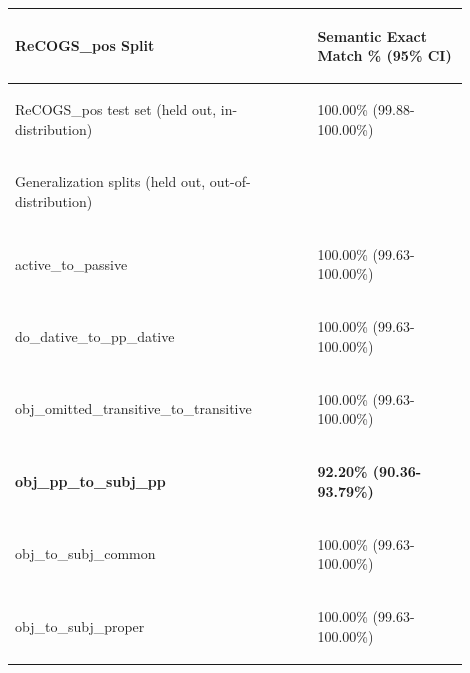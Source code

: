 \documentclass[11pt]{article}
\begin{document}
\twocolumn
\begin{table}
\centering
\begin{tabular}{p{0.6\linewidth} p{0.3\linewidth}}
\hline
\begin{tiny}\textbf{ReCOGS\_pos Split}\end{tiny} & \begin{tiny}\textbf{Semantic Exact Match \% (95\% CI)}\end{tiny} \\
\hline
\begin{tiny}ReCOGS\_pos test set (held out, in-distribution)\end{tiny} & \begin{tiny} 100.00\% (99.88-100.00\%)\end{tiny} \\
\hline
\begin{tiny}Generalization splits (held out, out-of-distribution)\end{tiny} & \\
\hline
\begin{tiny}active\_to\_passive\end{tiny} & \begin{tiny}100.00\% (99.63-100.00\%)\end{tiny} \\
\begin{tiny}do\_dative\_to\_pp\_dative\end{tiny} & \begin{tiny} 100.00\% (99.63-100.00\%)\end{tiny} \\
\begin{tiny}obj\_omitted\_transitive\_to\_transitive\end{tiny} & \begin{tiny} 100.00\% (99.63-100.00\%)\end{tiny} \\
\begin{tiny}\textbf{obj\_pp\_to\_subj\_pp}\end{tiny} & \begin{tiny} \textbf{92.20\% (90.36- 93.79\%)}\end{tiny} \\
\begin{tiny}obj\_to\_subj\_common\end{tiny} & \begin{tiny} 100.00\% (99.63-100.00\%)\end{tiny} \\
\begin{tiny}obj\_to\_subj\_proper\end{tiny} & \begin{tiny} 100.00\% (99.63-100.00\%)\end{tiny} \\

\end{tabular}
\end{table}
\end{document}
